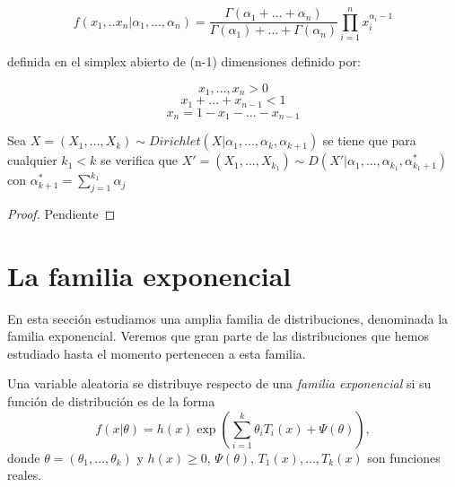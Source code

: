 \documentclass{article}
\newcommand{\importsection}[1]{}           %
\begin{document}
		\begin{equation*}
		f(x_1, .. x_n|\alpha_1, ...,\alpha_n) = \frac{\Gamma(\alpha_1 + ... + \alpha_n)}{\Gamma(\alpha_1) + ... + \Gamma(\alpha_n)} \prod_{i=1}^{n} {x_i ^ {\alpha_i - 1}}
		\end{equation*}

		definida en el simplex abierto de (n-1) dimensiones definido por:

		\begin{equation*}
		x_1, ... , x_n > 0
		\end{equation*}
		\begin{equation*}
		x_1 + ... + x_{n-1} < 1
		\end{equation*}
		\begin{equation*}
		x_n =  1 - x_1 - ... - x_{n-1}
		\end{equation*}

		\begin{thm}
			Sea $X = (X_1, ... , X_k) \sim Dirichlet(X|\alpha_1, ... , \alpha_k, \alpha_{k+1}) $ se tiene que para cualquier $k_1 < k$  se verifica que $X' =  (X_1, ... , X_{k_1}) \sim D(X'|\alpha_1, ... , \alpha_{k_1}, \alpha_{k_1 + 1}^{*}) $ con  $\alpha_{k+1}^{*} =\sum_{j=1}^{k_1} {\alpha_{j}}$
		\end{thm}

		\begin{proof}
			Pendiente
		\end{proof}


\pagebreak

\importsection{Estimacion.tex}

\pagebreak

\section{La familia exponencial}

    En esta sección estudiamos una amplia familia de distribuciones, denominada la familia exponencial. Veremos que gran parte de las distribuciones que hemos estudiado hasta el momento pertenecen a esta familia.

    \begin{definition}
        Una variable aleatoria se distribuye respecto de una \emph{familia exponencial} si su función de distribución es de la forma
        \begin{equation} \label{eq:exponencial}
            f(x | \theta) = h(x) \exp\left(\sum^k_{i=1} \theta_i T_i(x)  + \Psi (\theta)\right),
        \end{equation}
        donde $\theta = (\theta_1, \ldots, \theta_k)$ y $h(x) \ge 0$, $\Psi(\theta)$, $T_1(x), \ldots, T_k(x)$ son funciones reales.
    \end{definition}
\end{document}
